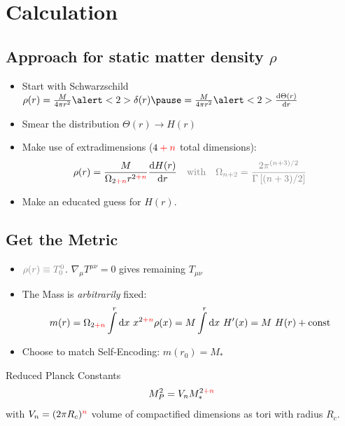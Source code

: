 \documentclass[xcolor=dvipsnames]{beamer}
\renewcommand{\d}{\mathrm{d}}
\newcommand{\dd}[2]{\frac{\mathrm{d} #1}{\mathrm{d} #2}}
\newcommand*{\mathcolor}{}
\def\mathcolor#1#{\mathcoloraux{#1}}
\newcommand*{\mathcoloraux}[3]{%
  \protect\leavevmode
  \begingroup
    \color#1{#2}#3%
  \endgroup
}
\newcommand{\pn}{\mathcolor{red}{+ n}}
\newcommand{\n}{ {\mathcolor{red}{n}} }
\newcommand{\gray}{ \color{gray} }
\begin{document}
\section{Calculation}
\subsection{Approach for static matter density $\rho$}
\begin{frame}
\begin{itemize}
\item Start with Schwarzschild $\rho(r) = \frac{M}{4 \pi r^2} \alert<2>{\delta(r)\pause} = \frac{M}{4 \pi r^2} \alert<2>{\dd{\Theta(r)}r}$
\pause
\item Smear the distribution $\Theta(r) \to H(r)$
\pause
\item Make use of extradimensions ($4\pn$ total dimensions):
\begin{equation*}
\rho(r) = \frac{M}{\Omega_{2\pn} r^{2\pn}} \dd{H(r)}{r}
\quad \gray \text{with}\quad \Omega_{n+2} = \frac{2 \pi^{(n+3)/2}}{\Gamma\left[ (n+3)/2 \right]}
\end{equation*}
\pause
\item Make an educated guess for $H(r)$.

\end{itemize}
\end{frame}

\subsection{Get the Metric}
\begin{frame}
\begin{itemize}
\item $\gray \rho(r) \equiv T_0^0$. $\nabla_{\mu} T^{\mu \nu} = 0$ {\gray gives remaining $T_{\mu\nu}$}
\pause
\item The Mass is \alert<2>{\it arbitrarily} fixed:
\begin{equation*}
m(r) = \Omega_{2\pn} \int \limits^r \d x~x^{2\pn} \rho(x)
= M \int \limits^r \d x~ H'(x)
= M~H(r) + \text{const}
\end{equation*}
\pause
\item Choose to match \alert<3>{Self-Encoding}: $m(r_0) = M_*$
\end{itemize}
\pause
\begin{block}{Reduced Planck Constants}
\vspace{-10pt}
\begin{equation*}
M_P^2 = V_n M_*^{2\pn}
\end{equation*}
with $V_n = (2\pi R_c)^\n$ volume of compactified dimensions as tori with radius $R_c$.
\end{block}
\end{frame}
\end{document}
